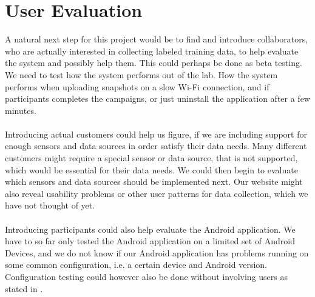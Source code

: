 \section{User Evaluation}

A natural next step for this project would be to find and introduce collaborators, who are actually interested in collecting labeled training data, to help evaluate the system and possibly help them. This could perhaps be done as beta testing. We need to test how the system performs out of the lab. How the system performs when uploading snapshots on a slow Wi-Fi connection, and if participants completes the campaigns, or just uninstall the application after a few minutes.
\\\\
Introducing actual customers could help us figure, if we are including support for enough sensors and data sources in order satisfy their data needs. Many different customers might require a special sensor or data source, that is not supported, which would be essential for their data needs. We could then begin to evaluate which sensors and data sources should be implemented next. Our website might also reveal usability problems or other user patterns for data collection, which we have not thought of yet.
\\\\
Introducing participants could also help evaluate the Android application. We have to so far only tested the Android application on a limited set of Android Devices, and we do not know if our Android application has problems running on some common configuration, i.e. a certain device and Android version. Configuration testing could however also be done without involving users as stated in .  